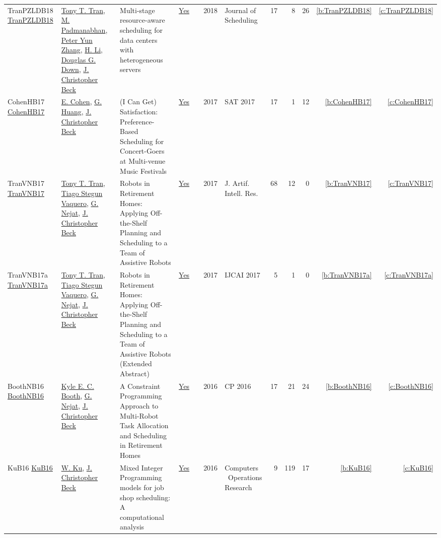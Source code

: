 {\begin{longtable}{>{\raggedright\arraybackslash}p{3cm}>{\raggedright\arraybackslash}p{6cm}>{\raggedright\arraybackslash}p{6.5cm}rrrp{2.5cm}rrrrr}
TranPZLDB18 \href{https://doi.org/10.1007/s10951-017-0537-x}{TranPZLDB18} & \hyperref[auth:a811]{Tony T. Tran}, \hyperref[auth:a812]{M. Padmanabhan}, \hyperref[auth:a813]{Peter Yun Zhang}, \hyperref[auth:a814]{H. Li}, \hyperref[auth:a815]{Douglas G. Down}, \hyperref[auth:a89]{J. Christopher Beck} & Multi-stage resource-aware scheduling for data centers with heterogeneous servers & \href{works/TranPZLDB18.pdf}{Yes} & \cite{TranPZLDB18} & 2018 & Journal of Scheduling & 17 & 8 & 26 & \ref{b:TranPZLDB18} & \ref{c:TranPZLDB18}\\
CohenHB17 \href{https://doi.org/10.1007/978-3-319-66263-3\_10}{CohenHB17} & \hyperref[auth:a817]{E. Cohen}, \hyperref[auth:a818]{G. Huang}, \hyperref[auth:a89]{J. Christopher Beck} & {(I} Can Get) Satisfaction: Preference-Based Scheduling for Concert-Goers at Multi-venue Music Festivals & \href{works/CohenHB17.pdf}{Yes} & \cite{CohenHB17} & 2017 & SAT 2017 & 17 & 1 & 12 & \ref{b:CohenHB17} & \ref{c:CohenHB17}\\
TranVNB17 \href{https://doi.org/10.1613/jair.5306}{TranVNB17} & \hyperref[auth:a811]{Tony T. Tran}, \hyperref[auth:a816]{Tiago Stegun Vaquero}, \hyperref[auth:a210]{G. Nejat}, \hyperref[auth:a89]{J. Christopher Beck} & Robots in Retirement Homes: Applying Off-the-Shelf Planning and Scheduling to a Team of Assistive Robots & \href{works/TranVNB17.pdf}{Yes} & \cite{TranVNB17} & 2017 & J. Artif. Intell. Res. & 68 & 12 & 0 & \ref{b:TranVNB17} & \ref{c:TranVNB17}\\
TranVNB17a \href{https://doi.org/10.24963/ijcai.2017/726}{TranVNB17a} & \hyperref[auth:a811]{Tony T. Tran}, \hyperref[auth:a816]{Tiago Stegun Vaquero}, \hyperref[auth:a210]{G. Nejat}, \hyperref[auth:a89]{J. Christopher Beck} & Robots in Retirement Homes: Applying Off-the-Shelf Planning and Scheduling to a Team of Assistive Robots (Extended Abstract) & \href{works/TranVNB17a.pdf}{Yes} & \cite{TranVNB17a} & 2017 & IJCAI 2017 & 5 & 1 & 0 & \ref{b:TranVNB17a} & \ref{c:TranVNB17a}\\
BoothNB16 \href{https://doi.org/10.1007/978-3-319-44953-1\_34}{BoothNB16} & \hyperref[auth:a209]{Kyle E. C. Booth}, \hyperref[auth:a210]{G. Nejat}, \hyperref[auth:a89]{J. Christopher Beck} & A Constraint Programming Approach to Multi-Robot Task Allocation and Scheduling in Retirement Homes & \href{works/BoothNB16.pdf}{Yes} & \cite{BoothNB16} & 2016 & CP 2016 & 17 & 21 & 24 & \ref{b:BoothNB16} & \ref{c:BoothNB16}\\
KuB16 \href{https://doi.org/10.1016/j.cor.2016.04.006}{KuB16} & \hyperref[auth:a337]{W. Ku}, \hyperref[auth:a89]{J. Christopher Beck} & Mixed Integer Programming models for job shop scheduling: {A} computational analysis & \href{works/KuB16.pdf}{Yes} & \cite{KuB16} & 2016 & Computers \  Operations Research & 9 & 119 & 17 & \ref{b:KuB16} & \ref{c:KuB16}\\

\end{longtable}}
